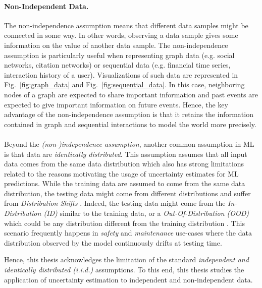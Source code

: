 \paragraph*{Non-Independent Data.} The non-independence assumption means that different data samples might be connected in some way. In other words, observing a data sample gives some information on the value of another data sample.
The non-independence assumption is particularly useful when representing graph data \cite{GNNBook2022} (e.g. social networks, citation networks) or sequential data \cite{shchur2021review, Dietterich2002Machine} (e.g. financial time series, interaction history of a user). Visualizations of such data are represented in Fig.~\ref{fig:graph_data} and Fig.~\ref{fig:sequential_data}.
In this case, neighboring nodes of a graph are expected to share important information and past events are expected to give important information on future events.
Hence, the key advantage of the non-independence assumption is that it retains the information contained in graph and sequential interactions to model the world more precisely.

\paragraph*{} Beyond the \emph{(non-)independence assumption}, another common assumption in ML is that data are \emph{identically distributed}. 
This assumption assumes that all input data comes from the same data distribution which also has strong limitations related to the reasons motivating the usage of uncertainty estimates for ML predictions.
While the training data are assumed to come from the same data distribution, the testing data might come from different distributions and suffer from \emph{Distribution Shifts} \cite{rabanser2019shift, dataset-shift}. 
Indeed, the testing data might come from the \emph{In-Distribution (ID)} similar to the training data, or a \emph{Out-Of-Distribution (OOD)} which could be any distribution different from the training distribution \cite{ood-detection-survey, shen2021ood}.
This scenario frequently happens in \emph{safety} and \emph{maintenance} use-cases where the data distribution observed by the model continuously drifts at testing time. 

Hence, this thesis acknowledges the limitation of the standard \emph{independent and identically distributed (i.i.d.)} assumptions.
To this end, this thesis studies the application of uncertainty estimation to independent and non-independent data.

